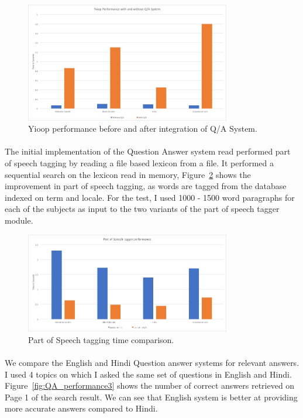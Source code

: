 \begin{figure}[htb]
\centering
\includegraphics[width=0.8\textwidth]{images/Yioopwith_withoutQA_Hindi.jpg}
\caption{Yioop performance before and after integration of Q/A System.} 
\label{fig:QA_performance1}
\end{figure}

\paragraph{}
The initial implementation of the Question Answer system read performed part of speech tagging by reading a file based lexicon from a file. It performed a sequential search on the lexicon read in memory, Figure~\ref{fig:QA_performance2} shows the improvement in part of speech tagging, as words are tagged from the database indexed on term and locale. For the test, I used 1000 - 1500 word paragraphs for each of the subjects as input to the two variants of the part of speech tagger module.

\begin{figure}[htb]
\centering
\includegraphics[width=0.8\textwidth]{images/YioopPoS_performance.jpg}
\caption{Part of Speech tagging time comparison.} 
\label{fig:QA_performance2}
\end{figure}
\break

\paragraph{}
We compare the English and Hindi Question answer systems for relevant answers. I used 4 topics on which I asked the same set of questions in English and Hindi. Figure~\ref{fig:QA_performance3} shows the number of correct answers retrieved on Page 1 of the search result. We can see that English system is better at providing more accurate answers compared to Hindi. 


